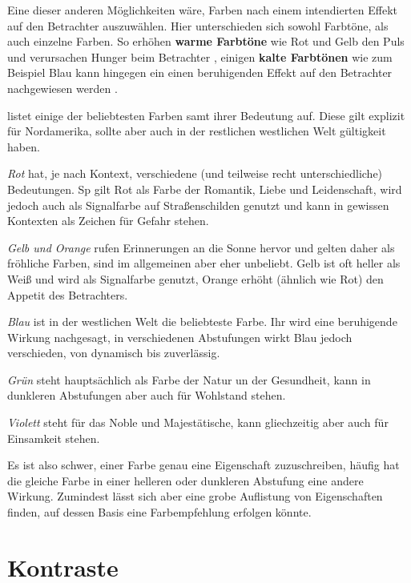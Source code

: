 Eine dieser anderen Möglichkeiten wäre, Farben nach einem intendierten Effekt auf den Betrachter auszuwählen.
Hier unterschieden sich sowohl Farbtöne, als auch einzelne Farben.
So erhöhen \textbf{warme Farbtöne} wie Rot und Gelb den Puls und verursachen Hunger beim Betrachter \cite{berman2010street},
einigen \textbf{kalte Farbtönen} wie zum Beispiel Blau kann hingegen ein einen beruhigenden Effekt auf den Betrachter nachgewiesen werden \cite{crozier1999meanings}.

\cite{berman2010street} listet einige der beliebtesten Farben samt ihrer Bedeutung auf. Diese gilt explizit für Nordamerika, sollte aber auch in der restlichen westlichen Welt gültigkeit haben.

\textit{Rot} hat, je nach Kontext, verschiedene (und teilweise recht unterschiedliche) Bedeutungen. Sp gilt Rot als Farbe der Romantik, Liebe und Leidenschaft, wird jedoch auch als Signalfarbe auf Straßenschilden genutzt und kann in gewissen Kontexten als Zeichen für Gefahr stehen.

\textit{Gelb und Orange} rufen Erinnerungen an die Sonne hervor und gelten daher als fröhliche Farben, sind im allgemeinen aber eher unbeliebt. Gelb ist oft heller als Weiß und wird als Signalfarbe genutzt, Orange erhöht (ähnlich wie Rot) den Appetit des Betrachters.

\textit{Blau} ist in der westlichen Welt die beliebteste Farbe. Ihr wird eine beruhigende Wirkung nachgesagt, in verschiedenen Abstufungen wirkt Blau jedoch verschieden, von dynamisch bis zuverlässig.

\textit{Grün} steht hauptsächlich als Farbe der Natur un der Gesundheit, kann in dunkleren Abstufungen aber auch für Wohlstand stehen.

\textit{Violett} steht für das Noble und Majestätische, kann gliechzeitig aber auch für Einsamkeit stehen.

Es ist also schwer, einer Farbe genau eine Eigenschaft zuzuschreiben, häufig hat die gleiche Farbe in einer helleren oder dunkleren Abstufung eine andere Wirkung. Zumindest lässt sich aber eine grobe Auflistung von Eigenschaften finden, auf dessen Basis eine Farbempfehlung erfolgen könnte.


\section{Kontraste}

